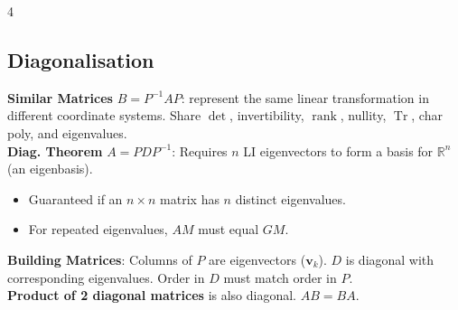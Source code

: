 \documentclass[9pt]{extarticle}
\begin{document}
\begin{multicols*}{4}
\subsection*{Diagonalisation}
\textbf{Similar Matrices} $B=P^{-1}AP$: represent the same linear transformation in different coordinate systems. Share $\det$, invertibility, $\operatorname{rank}$, nullity, $\operatorname{Tr}$, char poly, and eigenvalues.\\
\textbf{Diag. Theorem} $A=PDP^{-1}$: Requires $n$ LI eigenvectors to form a basis for $\mathbb{R}^{n}$ (an eigenbasis).
\begin{itemize}
    \item Guaranteed if an $n\times n$ matrix has $n$ distinct eigenvalues.
    \item For repeated eigenvalues, $AM$ must equal $GM$.
\end{itemize}
\textbf{Building Matrices}: Columns of $P$ are eigenvectors ($\mathbf{v}_{k}$). $D$ is diagonal with corresponding eigenvalues. Order in $D$ must match order in $P$.\\
\textbf{Product of 2 diagonal matrices} is also diagonal. $AB=BA$.



\end{multicols*}
\end{document}
